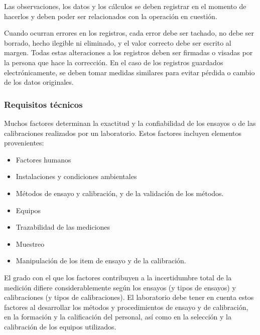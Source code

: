 					\par \noindent
						Las observaciones, los datos y los cálculos se deben registrar en el momento de hacerlos y
						deben poder ser relacionados con la operación en cuestión.
						
\newpage
\thispagestyle{plain}
						
					\par \noindent
						Cuando ocurran errores en los registros, cada error debe ser tachado, no debe ser borrado,
						hecho ilegible ni eliminado, y el valor correcto debe ser escrito al margen. Todas estas alteraciones a los
						registros deben ser firmadas o visadas por la persona que hace la corrección. En el caso de los registros
						guardados electrónicamente, se deben tomar medidas similares para evitar pérdida o cambio de los datos
						originales.
						
	\subsubsection{Requisitos técnicos}
		\par 
			Muchos factores determinan la exactitud y la confiabilidad de los ensayos o de las calibraciones
			realizados por un laboratorio. Estos factores incluyen elementos provenientes:
			
		\begin{itemize}
			\item Factores humanos
			
			\item Instalaciones y condiciones ambientales
			
			\item Métodos de ensayo y calibración, y de la validación de los métodos.
			
			\item Equipos
			
			\item Trazabilidad de las mediciones 
			
			\item Muestreo
			
			\item Manipulación de los item de ensayo y de la calibración.
		\end{itemize}

		\par \noindent
			El grado con el que los factores contribuyen a la incertidumbre total de la medición difiere
			considerablemente según los ensayos (y tipos de ensayos) y calibraciones (y tipos de calibraciones). El
			laboratorio debe tener en cuenta estos factores al desarrollar los métodos y procedimientos de ensayo y de
			calibración, en la formación y la calificación del personal, así como en la selección y la calibración de los
			equipos utilizados.
			
